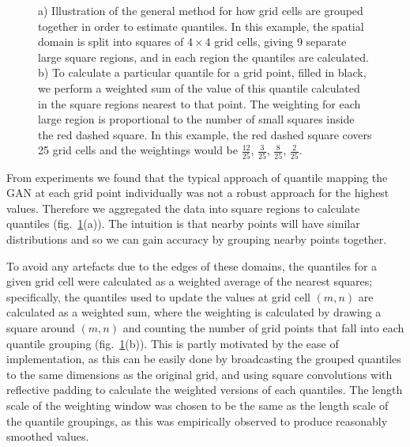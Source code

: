 \documentclass{article}
\begin{document}
\begin{figure}[h]
      \caption{a) Illustration of the general method for how grid cells are grouped together in order to estimate quantiles. In this example, the spatial domain is split into squares of $4 \times 4$ grid cells, giving 9 separate large square regions, and in each region the quantiles are calculated. b) To calculate a particular quantile for a grid point, filled in black, we perform a weighted sum of the value of this quantile calculated in the square regions nearest to that point. The weighting for each large region is proportional to the number of small squares inside the red dashed square. In this example, the red dashed square covers 25 grid cells and the weightings would be $\frac{12}{25}$, $\frac{3}{25}$, $\frac{8}{25}$, $\frac{2}{25}$.}
     \label{fig:quantiles}
\end{figure}    

From experiments we found that the typical approach of quantile mapping the GAN at each grid point individually was not a robust approach for the highest values. Therefore we aggregated the data into square regions to calculate quantiles (fig.~\ref{fig:quantiles}(a)). The intuition is that nearby points will have similar distributions and so we can gain accuracy by grouping nearby points together. 

To avoid any artefacts due to the edges of these domains, the quantiles for a given grid cell were calculated as a weighted average of the nearest squares; specifically, the quantiles used to update the values at grid cell $(m,n)$ are calculated as a weighted sum, where the weighting is calculated by drawing a square around $(m,n)$ and counting the number of grid points that fall into each quantile grouping (fig.~\ref{fig:quantiles}(b)). This is partly motivated by the ease of implementation, as this can be easily done by broadcasting the grouped quantiles to the same dimensions as the original grid, and using square convolutions with reflective padding to calculate the weighted versions of each quantiles. The length scale of the weighting window was chosen to be the same as the length scale of the quantile groupings, as this was empirically observed to produce reasonably smoothed values.
\end{document}
